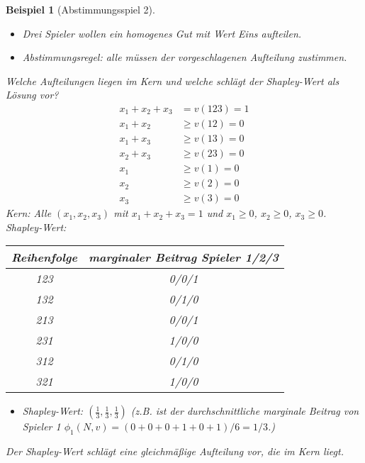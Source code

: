 \documentclass[12pt]{extreport} %
\theoremstyle{named}
\theoremstyle{itshape}
\theoremstyle{normal}
\newtheorem{beispiel}[unnamedtheorem]{Beispiel}
\begin{document}
\begin{beispiel}[Abstimmungsspiel 2] ~\
	\begin{itemize}
		\item Drei Spieler wollen ein homogenes Gut mit Wert Eins aufteilen. 
		\item Abstimmungsregel: alle müssen der vorgeschlagenen Aufteilung zustimmen.
	\end{itemize}
	Welche Aufteilungen liegen im Kern und welche schlägt der Shapley-Wert als Lösung vor?
	\begin{align*}
		x_1 + x_2 + x_3 & = v(123) = 1 \\
		x_1 + x_2 & \geq v(12) = 0 \\
		x_1 + x_3 & \geq v(13) = 0 \\
		x_2 + x_3 & \geq v(23) = 0 \\
		x_1 & \geq v(1) = 0 \\
		x_2 & \geq v(2) = 0 \\
		x_3 & \geq v(3) = 0 		
	\end{align*}
	Kern: Alle $(x_1, x_2, x_3)$ mit $x_1 + x_2 + x_3 = 1$ und $x_1 \geq 0$, $x_2 \geq 0$, $x_3 \geq 0$. Shapley-Wert: ~\\
	  \begin{figure*}[h!] \centering
		\begin{tabular}{cc}
  			\hline
  				Reihenfolge & marginaler Beitrag Spieler 1/2/3 \\
  			\hline
  				123 & 0/0/1 \\
  				132 & 0/1/0 \\
  				213 & 0/0/1 \\
  				231 & 1/0/0 \\
  				312 & 0/1/0 \\
  				321 & 1/0/0 \\
  			\hline
		\end{tabular}
	\end{figure*}
	\begin{itemize}
		\item Shapley-Wert: $\left( \frac{1}{3}, \frac{1}{3}, \frac{1}{3} \right)$ (z.B. ist der durchschnittliche marginale Beitrag von Spieler 1 $\phi_1(N, v) = (0+0+0+1+0+1)/6 = 1/3$.)
	\end{itemize}
	Der Shapley-Wert schlägt eine gleichmäßige Aufteilung vor, die im Kern liegt.
\end{beispiel}
\end{document}
